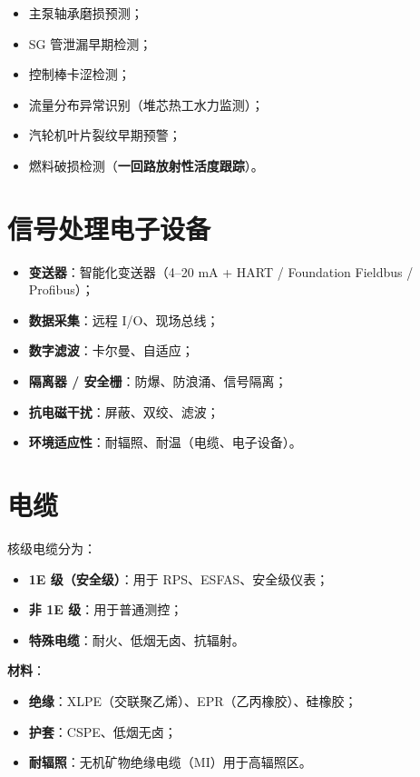 \documentclass[
  UTF8,
  scheme=plain,
  fontsize=10pt,
  openany
]{ctexbook}
\begin{document}
\begin{itemize}
\tightlist
\item
  主泵轴承磨损预测；
\item
  SG 管泄漏早期检测；
\item
  控制棒卡涩检测；
\item
  流量分布异常识别（堆芯热工水力监测）；
\item
  汽轮机叶片裂纹早期预警；
\item
  燃料破损检测（\textbf{一回路放射性活度跟踪}）。
\end{itemize}

\section{信号处理电子设备}\label{ux4fe1ux53f7ux5904ux7406ux7535ux5b50ux8bbeux5907}

\begin{itemize}
\tightlist
\item
  \textbf{变送器}：智能化变送器（4--20 mA + HART / Foundation Fieldbus /
  Profibus）；
\item
  \textbf{数据采集}：远程 I/O、现场总线；
\item
  \textbf{数字滤波}：卡尔曼、自适应；
\item
  \textbf{隔离器 / 安全栅}：防爆、防浪涌、信号隔离；
\item
  \textbf{抗电磁干扰}：屏蔽、双绞、滤波；
\item
  \textbf{环境适应性}：耐辐照、耐温（电缆、电子设备）。
\end{itemize}

\section{电缆}\label{ux7535ux7f06}

核级电缆分为：

\begin{itemize}
\tightlist
\item
  \textbf{1E 级（安全级）}：用于 RPS、ESFAS、安全级仪表；
\item
  \textbf{非 1E 级}：用于普通测控；
\item
  \textbf{特殊电缆}：耐火、低烟无卤、抗辐射。
\end{itemize}

\textbf{材料}：

\begin{itemize}
\tightlist
\item
  \textbf{绝缘}：XLPE（交联聚乙烯）、EPR（乙丙橡胶）、硅橡胶；
\item
  \textbf{护套}：CSPE、低烟无卤；
\item
  \textbf{耐辐照}：无机矿物绝缘电缆（MI）用于高辐照区。
\end{itemize}
\end{document}
